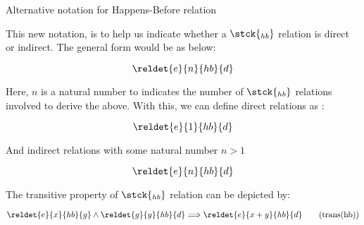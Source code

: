    \begin{definition}{Alternative notation for Happens-Before relation}
    
    
        This new notation, is to help us indicate whether a $\stck{_{hb}}$ relation is direct or indirect. The general form would be as below:
        
            \[ \reldet{e}{n}{hb}{d} \]
            
        Here, $n$ is a natural number to indicates the number of $\stck{_{hb}}$ relations involved to derive the above. With this, we can define direct relations as :
        
            \[ \reldet{e}{1}{hb}{d} \]
        
        And indirect relations with some natural number $n>1$
        
            \[ \reldet{e}{n}{hb}{d} \]
        
        The transitive property of $\stck{_{hb}}$ relation can be depicted by: 
    
            \[
                \reldet{e}{x}{hb}{g} \wedge
                \reldet{g}{y}{hb}{d} \Longrightarrow
                \reldet{e}{x+y}{hb}{d}
                \tag{trans(hb)}
                \label{ggwpez}
            \]
    
    \end{definition}
 